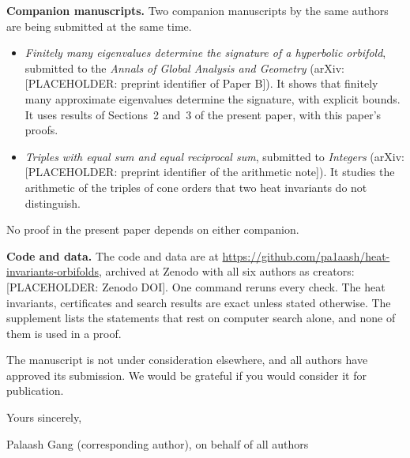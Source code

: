 \documentclass[11pt]{article}
\begin{document}
\textbf{Companion manuscripts.} Two companion manuscripts by the same authors are being submitted at the same time.
\begin{itemize}\setlength{\itemsep}{2pt}
\item \emph{Finitely many eigenvalues determine the signature of a hyperbolic orbifold}, submitted to the \emph{Annals of Global Analysis and Geometry} (arXiv:[PLACEHOLDER: preprint identifier of Paper B]). It shows that finitely many approximate eigenvalues determine the signature, with explicit bounds. It uses results of Sections~2 and~3 of the present paper, with this paper's proofs.
\item \emph{Triples with equal sum and equal reciprocal sum}, submitted to \emph{Integers} (arXiv:[PLACEHOLDER: preprint identifier of the arithmetic note]). It studies the arithmetic of the triples of cone orders that two heat invariants do not distinguish.
\end{itemize}
No proof in the present paper depends on either companion.

\textbf{Code and data.} The code and data are at \url{https://github.com/pa1aash/heat-invariants-orbifolds}, archived at Zenodo with all six authors as creators: [PLACEHOLDER: Zenodo DOI]. One command reruns every check. The heat invariants, certificates and search results are exact unless stated otherwise. The supplement lists the statements that rest on computer search alone, and none of them is used in a proof.

The manuscript is not under consideration elsewhere, and all authors have approved its submission. We would be grateful if you would consider it for publication.

Yours sincerely,

\vspace{7mm}
Palaash Gang (corresponding author), on behalf of all authors
\end{document}

